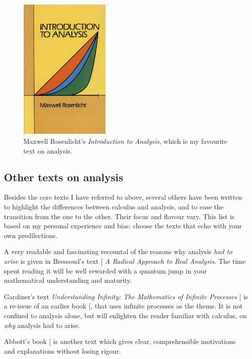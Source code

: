 \documentclass[
  a4paper,
]{article}
\begin{document}
\begin{figure}
\centering
\includegraphics[width=0.4\textwidth,height=\textheight]{images/rosenlicht.jpg}
\caption{Maxwell Rosenlicht's \emph{Introduction to Analysis}, which is
my favourite text on analysis.}\label{fig:rosenlicht}
\end{figure}

\subsection{Other texts on analysis}\label{other-texts-on-analysis}

Besides the core texts I have referred to above, several others have
been written to highlight the differences between calculus and analysis,
and to ease the transition from the one to the other. Their focus and
flavour vary. This list is based on my personal experience and bias:
choose the texts that echo with your own predilections.

A very readable and fascinating recountal of the reasons why analysis
\emph{had to arise} is given in Bressoud's text
{[}\citeproc{ref-bressoud2007}{11}{]} \emph{A Radical Approach to Real
Analysis}. The time spent reading it will be well rewarded with a
quantum jump in your mathematical understanding and maturity.

Gardiner's text \emph{Understanding Infinity: The Mathematics of
Infinite Processes} {[}\citeproc{ref-gardiner2002}{12}{]} is a re-issue
of an earlier book {[}\citeproc{ref-gardiner1982}{13}{]}, that uses
infinite processes as the theme. It is not confined to analysis alone,
but will enlighten the reader familiar with calculus, on \emph{why}
analysis had to arise.

Abbott's book {[}\citeproc{ref-abbott2001}{14}{]} is another text which
gives clear, comprehensible motivations and explanations without losing
rigour.
\end{document}
